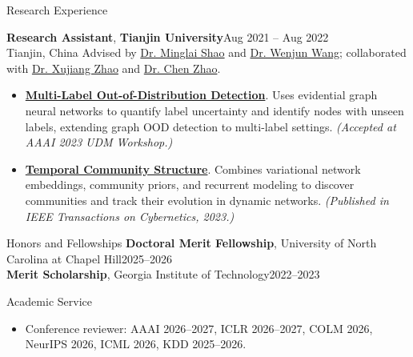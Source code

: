 \documentclass{resume}
\newcommand{\role}[4]{\par\addvspace{6pt}\Needspace{5\baselineskip}\textbf{#1}, \textbf{#2}\hfill #3\\#4\enspace\textbar\enspace}
\begin{document}
\begin{rSection}{Research Experience}
\role{Research Assistant}{Tianjin University}{Aug 2021 -- Aug 2022}{Tianjin, China}
Advised by \href{https://scholar.google.com/citations?hl=en&user=2FDgNl0AAAAJ}{Dr. Minglai Shao} and \href{https://scholar.google.com/citations?hl=en&user=h2WHkq8AAAAJ}{Dr. Wenjun Wang}; collaborated with \href{https://scholar.google.com/citations?hl=en&user=k2-JcFAAAAAJ}{Dr. Xujiang Zhao} and \href{https://scholar.google.com/citations?user=xebNvXQAAAAJ&hl=en}{Dr. Chen Zhao}.
\begin{itemize}[itemsep=1pt]
\item \textbf{\href{https://charliezhaoyinpeng.github.io/UDM-AAAI23/assets/papers/Ding/CameraReady/AAAI23_UDM_MLVC_CameraReady.pdf}{Multi-Label Out-of-Distribution Detection}}. Uses evidential graph neural networks to quantify label uncertainty and identify nodes with unseen labels, extending graph OOD detection to multi-label settings. \textit{(Accepted at AAAI 2023 UDM Workshop.)}
\item \textbf{\href{https://cam.tju.edu.cn/homepage/wuhuaming/PDF/TCYB2.pdf}{Temporal Community Structure}}. Combines variational network embeddings, community priors, and recurrent modeling to discover communities and track their evolution in dynamic networks. \textit{(Published in IEEE Transactions on Cybernetics, 2023.)}
\end{itemize}
\end{rSection}

\begin{rSection}{Honors and Fellowships}
\textbf{Doctoral Merit Fellowship}, University of North Carolina at Chapel Hill\hfill 2025--2026\\[5pt]
\textbf{Merit Scholarship}, Georgia Institute of Technology\hfill 2022--2023
\end{rSection}

\begin{rSection}{Academic Service}
\begin{itemize}
\item Conference reviewer: AAAI 2026--2027, ICLR 2026--2027, COLM 2026, NeurIPS 2026, ICML 2026, KDD 2025--2026.
\end{itemize}
\end{rSection}
\end{document}
